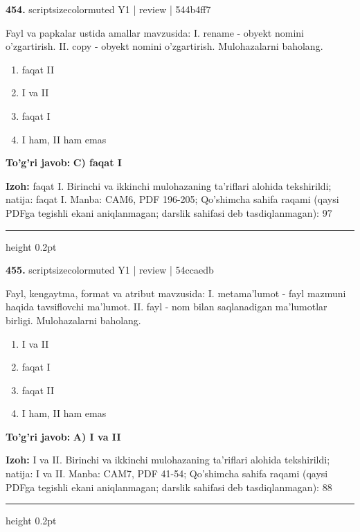 \documentclass[10pt,a4paper]{article}
\begin{document}
{\bfseries\sffamily\color{ink} 454.} {scriptsizecolor{muted} Y1 | review | 544b4ff7}
\par
Fayl va papkalar ustida amallar mavzusida: I. rename - obyekt nomini o'zgartirish. II. copy - obyekt nomini o'zgartirish. Mulohazalarni baholang.
\begin{enumerate}[label=\Alph*),leftmargin=9mm]
\item faqat II
\item I va II
\item faqat I
\item I ham, II ham emas
\end{enumerate}
\begin{tcolorbox}[enhanced,breakable,colback=teal!4,colframe=teal!60!black,boxrule=0.45pt,arc=1.2mm,left=2.7mm,right=2.7mm,top=1.8mm,bottom=1.8mm,before skip=2mm,after skip=2mm]
{\bfseries\sffamily\color{teal}To'g'ri javob:} \textbf{C) faqat I}
\par\smallskip
{\bfseries Izoh:} faqat I. Birinchi va ikkinchi mulohazaning ta'riflari alohida tekshirildi; natija: faqat I. Manba: CAM6, PDF 196-205; Qo'shimcha sahifa raqami (qaysi PDFga tegishli ekani aniqlanmagan; darslik sahifasi deb tasdiqlanmagan): 97
\end{tcolorbox}
\vspace{2mm}\hrule height 0.2pt\vspace{3mm}

{\bfseries\sffamily\color{ink} 455.} {scriptsizecolor{muted} Y1 | review | 54ccaedb}
\par
Fayl, kengaytma, format va atribut mavzusida: I. metama'lumot - fayl mazmuni haqida tavsiflovchi ma'lumot. II. fayl - nom bilan saqlanadigan ma'lumotlar birligi. Mulohazalarni baholang.
\begin{enumerate}[label=\Alph*),leftmargin=9mm]
\item I va II
\item faqat I
\item faqat II
\item I ham, II ham emas
\end{enumerate}
\begin{tcolorbox}[enhanced,breakable,colback=teal!4,colframe=teal!60!black,boxrule=0.45pt,arc=1.2mm,left=2.7mm,right=2.7mm,top=1.8mm,bottom=1.8mm,before skip=2mm,after skip=2mm]
{\bfseries\sffamily\color{teal}To'g'ri javob:} \textbf{A) I va II}
\par\smallskip
{\bfseries Izoh:} I va II. Birinchi va ikkinchi mulohazaning ta'riflari alohida tekshirildi; natija: I va II. Manba: CAM7, PDF 41-54; Qo'shimcha sahifa raqami (qaysi PDFga tegishli ekani aniqlanmagan; darslik sahifasi deb tasdiqlanmagan): 88
\end{tcolorbox}
\vspace{2mm}\hrule height 0.2pt\vspace{3mm}
\end{document}
